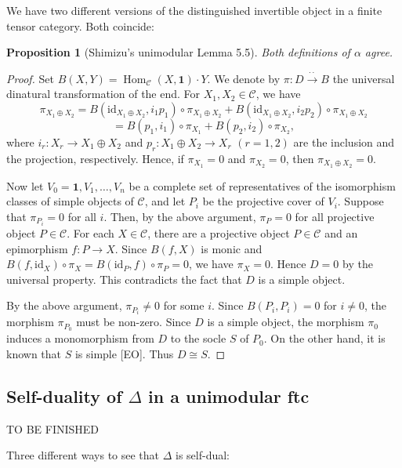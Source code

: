 \documentclass[11pt]{article}
\newtheorem{proposition}[theorem]{Proposition}
\theoremstyle{definition}
\begin{document}
We have two different versions of the distinguished invertible object in a finite tensor category. Both coincide:


\begin{proposition}[Shimizu's unimodular Lemma 5.5]
Both definitions of $\alpha$ agree.
\end{proposition}

\begin{proof}
Set $B(X,Y) = \operatorname{Hom}_{\mathcal{C}}(X,\mathbf{1}) \cdot Y$. We denote by $\pi \colon D \xrightarrow{\cdot\cdot} B$ the universal dinatural transformation of the end. For $X_1, X_2 \in \mathcal{C}$, we have
\[
\pi_{X_1 \oplus X_2} = B(\mathrm{id}_{X_1 \oplus X_2}, i_1 p_1) \circ \pi_{X_1 \oplus X_2} + B(\mathrm{id}_{X_1 \oplus X_2}, i_2 p_2) \circ \pi_{X_1 \oplus X_2}
\]
\[
= B(p_1, i_1) \circ \pi_{X_1} + B(p_2, i_2) \circ \pi_{X_2},
\]
where $i_r \colon X_r \to X_1 \oplus X_2$ and $p_r \colon X_1 \oplus X_2 \to X_r$ $(r = 1,2)$ are the inclusion and the projection, respectively. Hence, if $\pi_{X_1} = 0$ and $\pi_{X_2} = 0$, then $\pi_{X_1 \oplus X_2} = 0$.

Now let $V_0 = \mathbf{1}, V_1, \dots, V_n$ be a complete set of representatives of the isomorphism classes of simple objects of $\mathcal{C}$, and let $P_i$ be the projective cover of $V_i$. Suppose that $\pi_{P_i} = 0$ for all $i$. Then, by the above argument, $\pi_P = 0$ for all projective object $P \in \mathcal{C}$. For each $X \in \mathcal{C}$, there are a projective object $P \in \mathcal{C}$ and an epimorphism $f \colon P \to X$. Since $B(f,X)$ is monic and $B(f,\mathrm{id}_X) \circ \pi_X = B(\mathrm{id}_P, f) \circ \pi_P = 0$, we have $\pi_X = 0$. Hence $D = 0$ by the universal property. This contradicts the fact that $D$ is a simple object.

By the above argument, $\pi_{P_i} \neq 0$ for some $i$. Since $B(P_i, P_i) = 0$ for $i \neq 0$, the morphism $\pi_{P_0}$ must be non-zero. Since $D$ is a simple object, the morphism $\pi_0$ induces a monomorphism from $D$ to the socle $S$ of $P_0$. On the other hand, it is known that $S$ is simple [EO]. Thus $D \cong S$.
\end{proof}


\subsection{Self-duality of $\Delta$ in a unimodular ftc}
{\color{red} TO BE FINISHED }

Three different ways to see that $\Delta $ is self-dual:
\end{document}

